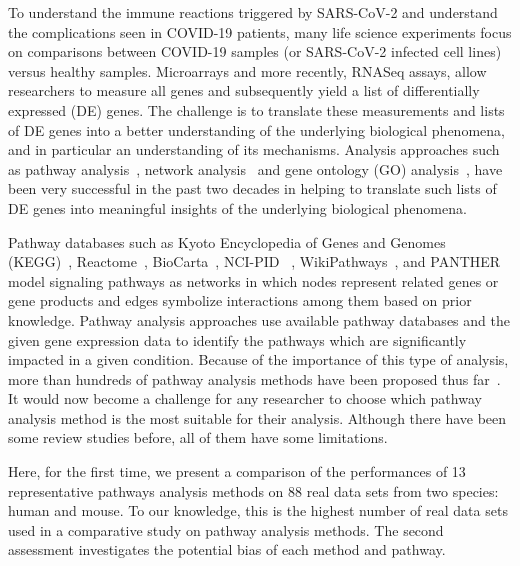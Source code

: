 To understand the immune reactions triggered by SARS-CoV-2 and understand the complications seen in COVID-19 patients, many life science experiments focus on comparisons between COVID-19 samples (or SARS-CoV-2 infected cell lines) versus healthy samples.
Microarrays and more recently, RNASeq assays, allow researchers to measure all genes and subsequently  yield a list of differentially expressed (DE) genes.
The challenge is to translate these measurements and lists of DE genes into a better understanding of the underlying biological phenomena, and in particular an understanding of its mechanisms. Analysis approaches such as pathway analysis~\cite{DraghiciOntologicalToolsReview:2005,Khatri:2012, mitrea2013methods, tarca2013comparison, nguyen2018network, ihnatova2018critical, nguyen2019identifying}, network analysis~\cite{mitra2013integrative} and gene ontology (GO) analysis~\cite{DraghiciOntologicalToolsReview:2005,Rhee:2008}, have been very successful in the past two decades in helping to translate such lists of DE genes into meaningful insights of the underlying biological phenomena. 

Pathway databases such as Kyoto Encyclopedia of Genes and Genomes (KEGG)~\cite{Kanehisa:2000}, Reactome~\cite{croft2014reactome}, BioCarta~\cite{BioCartaWWW}, NCI-PID ~\cite{Schaefer:2009}, WikiPathways~\cite{pico2008wikipathways}, and PANTHER~\cite{thomas2003panther} model signaling pathways as networks in which nodes represent related genes or gene products and edges symbolize interactions among them based on prior knowledge. 
Pathway analysis approaches use available pathway databases and the given gene expression data to identify the pathways which are significantly impacted in a given condition. 
Because of the importance of this type of analysis, more than hundreds of pathway analysis methods have been proposed thus far~\cite{DraghiciOntologicalToolsReview:2005,Khatri:2002,mitrea2013methods}.
It would now become a challenge for any researcher to choose which pathway analysis method is the most suitable for their analysis. 
Although there have been some review studies before, all of them have some limitations.

Here, for the first time, we present a comparison of the performances of 13 representative pathways analysis methods on 88 real data sets from two species: human and mouse. 
To our knowledge, this is the highest number of real data sets used in a comparative study on pathway analysis methods.
The second assessment investigates the potential bias of each method and pathway.

